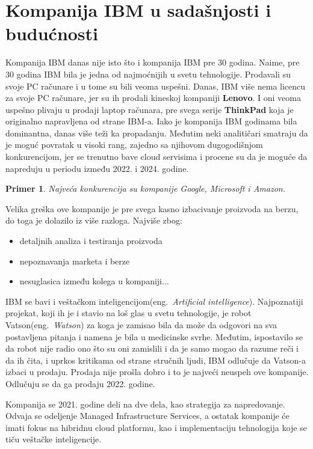\documentclass[a4paper]{article}
\newtheorem{primer}{Primer}[section]
\begin{document}
\section{Kompanija IBM u sadašnjosti i budućnosti}
Kompanija IBM danas nije isto što i kompanija IBM pre 30 godina. Naime, pre 30 godina IBM bila je jedna od najmoćnijih u svetu tehnologije. Prodavali su svoje PC računare i u tome su bili veoma uspešni.
Danas, IBM više nema licencu za svoje PC računare, jer su ih prodali kineskoj kompaniji \textbf{Lenovo}\cite{lit1}. I oni veoma uspešno plivaju u prodaji laptop računara, pre svega serije \textbf{ThinkPad} koja je originalno napravljena od strane IBM-a. Iako je kompanija IBM godinama bila dominantna, danas više teži ka propadanju. Međutim neki analitičari smatraju da je moguć povratak u visoki rang, zajedno sa njihovom dugogodišnjom konkurencijom, jer se trenutno bave cloud servisima i procene su da je moguće da napreduju u periodu između 2022. i 2024. godine.

\begin{primer}
Najveća konkurencija su kompanije Google, Microsoft i Amazon.
\end{primer}

Velika greška ove kompanije je pre svega kasno izbacivanje proizvoda na berzu, do toga je dolazilo iz više razloga. Najviše zbog:

\begin{itemize}
\item detaljnih analiza i testiranja proizvoda
\item nepoznavanja marketa i berze
\item nesuglasica između kolega u kompaniji...
\end{itemize}

IBM se bavi i veštačkom inteligencijom(eng.~{\em Artificial intelligence}). Najpoznatiji projekat, koji ih je i stavio na loš glas u svetu tehnologije, je robot Vatson(eng.~{\em Watson}) za koga je zamisao bila da može da odgovori na sva postavljena pitanja i namena je bila u medicinske svrhe. Međutim, ispostavilo se da robot nije radio ono što su oni zamislili i da je samo mogao da razume reči i da ih čita, i uprkos kritikama od strane stručnih ljudi, IBM odlučuje da Vatson-a izbaci u prodaju. Prodaja nije prošla dobro i to je najveći neuspeh ove kompanije. Odlučuju se da ga prodaju 2022. godine.

Kompanija se 2021. godine deli na dve dela, kao strategija za napredovanje. Odvaja se odeljenje Managed Infrastructure Services, a ostatak kompanije će imati fokus na hibridnu cloud platformu, kao i implementaciju tehnologija koje se tiču veštačke inteligencije.
\end{document}
